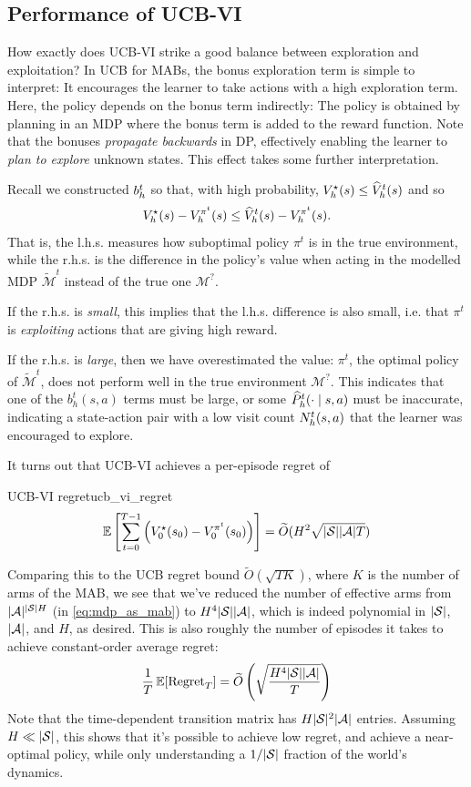 \documentclass[\main/main]{subfiles}
\begin{document}
\subsection{Performance of UCB-VI}

How exactly does UCB-VI strike a good balance between exploration and exploitation? In UCB for MABs, the bonus exploration term is simple to interpret: It encourages the learner to take actions with a high exploration term.
Here, the policy depends on the bonus term indirectly: The policy is obtained by planning in an MDP where the bonus term is added to the reward function.
Note that the bonuses \emph{propagate backwards} in DP, effectively enabling the learner to \emph{plan to explore} unknown states.
This effect takes some further interpretation.

Recall we constructed $b^t_\hi$ so that, with high probability, $\Vopt_\hi(s) \le \hat{V}_\hi^t(s)$ and so \[
    \Vopt_\hi(s) - V^{\pi^t}_\hi(s) \le \hat{V}_\hi^t(s) - V^{\pi^t}_\hi(s).
\]
That is, the l.h.s. measures how suboptimal policy $\pi^t$ is in the true environment,
while the r.h.s. is the difference in the policy's value when acting in the modelled MDP $\tilde{\mathcal{M}}^t$ instead of the true one $\mathcal{M}^{?}$.

If the r.h.s. is \emph{small}, this implies that the l.h.s. difference is also small, i.e. that $\pi^t$ is \emph{exploiting} actions that are giving high reward.

If the r.h.s. is \emph{large}, then we have overestimated the value: $\pi^t$, the optimal policy of $\tilde{\mathcal{M}}^t$, does not perform well in the true environment $\mathcal{M}^{?}$. This indicates that one of the $b_h^t(s, a)$ terms must be large, or some $\hat P^t_\hi(\cdot \mid s, a)$ must be inaccurate, indicating a state-action pair with a low visit count $N^t_\hi(s, a)$ that the learner was encouraged to explore.

It turns out that UCB-VI achieves a per-episode regret of
\begin{theorem}{UCB-VI regret}{ucb_vi_regret}
    \[
        \E \left[ \sum_{t=0}^{T-1} \left(\Vopt_0(s_0) - V^{\pi^t}_0(s_0) \right) \right] = \tilde{O}(H^2 \sqrt{|\S| |\A| T})
    \]
\end{theorem}

Comparing this to the UCB regret bound $\tilde{O}(\sqrt{T K})$, where $K$ is the number of arms of the MAB, we see that we've reduced the number of effective arms from
$|\A|^{|\S|\hor}$ (in \eqref{eq:mdp_as_mab}) to $H^4 |\S||\A|$, which is indeed polynomial in $|\S|$, $|\A|$, and $H$, as desired.
This is also roughly the number of episodes it takes to achieve constant-order average regret:
\[
    \frac{1}{T} \E[\text{Regret}_T] = \tilde{O}\left(\sqrt{\frac{H^4 |\S||\A|}{T}}\right)
\]
Note that the time-dependent transition matrix has $H |\S|^2 |\A|$ entries.
Assuming $H \ll |\S|$, this shows that it's possible to achieve low regret, and achieve a near-optimal policy, while only understanding a $1/|\S|$ fraction of the world's dynamics.
\end{document}
